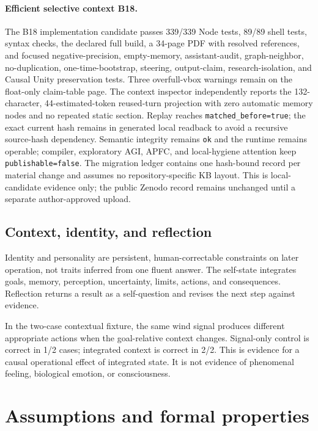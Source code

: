 \documentclass[10pt,twocolumn]{article}
\theoremstyle{definition}
\theoremstyle{plain}
\theoremstyle{remark}
\newcommand{\file}[1]{\nolinkurl{#1}}
\newcommand{\efficientcontextrevision}{\textsf{B18}}
\begin{document}
\paragraph{Efficient selective context \efficientcontextrevision.}
The B18 implementation candidate passes 339/339 Node tests, 89/89 shell tests, syntax checks, the declared full build, a 34-page PDF with resolved references, and focused negative-precision, empty-memory, assistant-audit, graph-neighbor, no-duplication, one-time-bootstrap, steering, output-claim, research-isolation, and Causal Unity preservation tests.  Three overfull-vbox warnings remain on the float-only claim-table page.  The context inspector independently reports the 132-character, 44-estimated-token reused-turn projection with zero automatic memory nodes and no repeated static section.  Replay reaches \file{matched\_before=true}; the exact current hash remains in generated local readback to avoid a recursive source-hash dependency.  Semantic integrity remains \file{ok} and the runtime remains operable; compiler, exploratory AGI, APFC, and local-hygiene attention keep \file{publishable=false}.  The migration ledger contains one hash-bound record per material change and assumes no repository-specific KB layout.  This is local-candidate evidence only; the public Zenodo record remains unchanged until a separate author-approved upload.

\subsection{Context, identity, and reflection}
\label{sec:contextual}

Identity and personality are persistent, human-correctable constraints on later operation, not traits inferred from one fluent answer.  The self-state integrates goals, memory, perception, uncertainty, limits, actions, and consequences.  Reflection returns a result as a self-question and revises the next step against evidence.

In the two-case contextual fixture, the same wind signal produces different appropriate actions when the goal-relative context changes.  Signal-only control is correct in 1/2 cases; integrated context is correct in 2/2.  This is evidence for a causal operational effect of integrated state.  It is not evidence of phenomenal feeling, biological emotion, or consciousness.

\section{Assumptions and formal properties}
\label{sec:formal}
\end{document}
